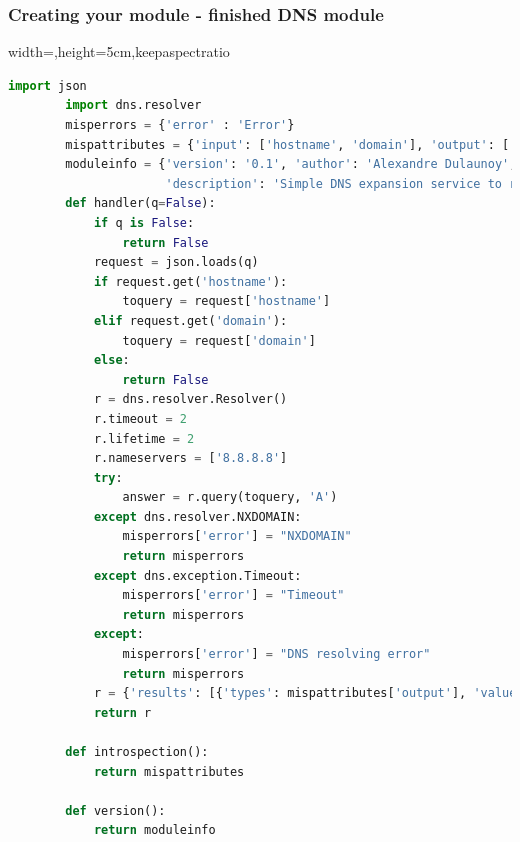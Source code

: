  \begin{frame}[fragile]
      \frametitle{Creating your module - finished DNS module}
      \begin{adjustbox}{width=\textwidth,height=5cm,keepaspectratio}
      \begin{lstlisting}[language=python]
        import json
        import dns.resolver
        misperrors = {'error' : 'Error'}
        mispattributes = {'input': ['hostname', 'domain'], 'output': ['ip-src', 'ip-dst']}
        moduleinfo = {'version': '0.1', 'author': 'Alexandre Dulaunoy',
                      'description': 'Simple DNS expansion service to resolve IP address from MISP attributes', 'module-type': ['expansion','hover']}
        def handler(q=False):
            if q is False:
                return False
            request = json.loads(q)
            if request.get('hostname'):
                toquery = request['hostname']
            elif request.get('domain'):
                toquery = request['domain']
            else:
                return False
            r = dns.resolver.Resolver()
            r.timeout = 2
            r.lifetime = 2
            r.nameservers = ['8.8.8.8']
            try:
                answer = r.query(toquery, 'A')
            except dns.resolver.NXDOMAIN:
                misperrors['error'] = "NXDOMAIN"
                return misperrors
            except dns.exception.Timeout:
                misperrors['error'] = "Timeout"
                return misperrors
            except:
                misperrors['error'] = "DNS resolving error"
                return misperrors
            r = {'results': [{'types': mispattributes['output'], 'values':[str(answer[0])]}]}
            return r

        def introspection():
            return mispattributes

        def version():
            return moduleinfo
              \end{lstlisting}
        \end{adjustbox}
\end{frame}

